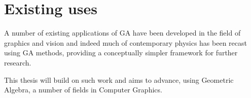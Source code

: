 \section{Existing uses}

A number of existing applications of GA have been developed in the
field of graphics and vision\cite{DBLP:conf/giae/WarehamCL04,SahanLasenby} and
indeed much of contemporary physics has been recast using GA 
methods\cite{DoranLasenby}, providing a conceptually simpler
framework for further research.

This thesis will build on such work and aims to advance, using Geometric
Algebra, a number of fields in Computer Graphics.

